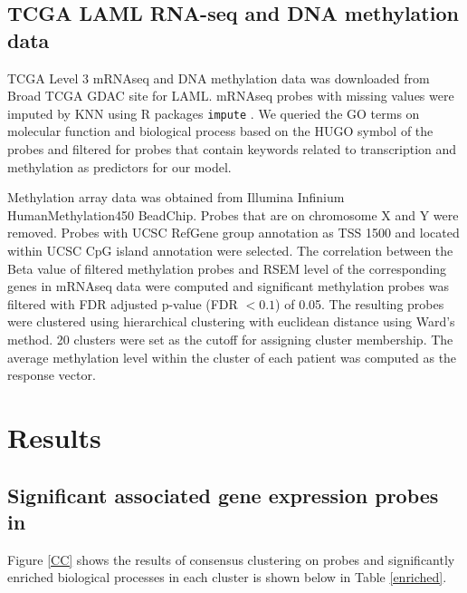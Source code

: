 \documentclass{article}
\begin{document}
\subsection{TCGA LAML RNA-seq and DNA methylation data}
TCGA Level 3 mRNAseq and DNA methylation data was downloaded from Broad TCGA GDAC site for LAML. mRNAseq probes with missing values were imputed by KNN using R packages \texttt{impute} \citep{hastie2001impute}. We queried the GO terms on molecular function and biological process based on the HUGO symbol of the probes and filtered for probes that contain keywords related to transcription and methylation as predictors for our model.   

Methylation array data was obtained from Illumina Infinium HumanMethylation450 BeadChip. Probes that are on chromosome X and Y were removed. Probes with UCSC RefGene group annotation as TSS 1500 and located within UCSC CpG island annotation were selected. The correlation between the Beta value of filtered methylation probes and RSEM level of the corresponding genes in mRNAseq data were computed and significant methylation probes was filtered with FDR adjusted p-value (FDR $< 0.1$) of 0.05. The resulting probes were clustered using hierarchical clustering with euclidean distance using Ward's method. 20 clusters were set as the cutoff for assigning cluster membership. The average methylation level within the cluster of each patient was computed as the response vector. 


\section{Results}

\subsection{Significant associated gene expression probes in \citet{figueroa2010dna}}

Figure \ref{CC} shows the results of consensus clustering on probes and significantly enriched biological processes in each cluster is shown below in Table \ref{enriched}. 
\end{document}
